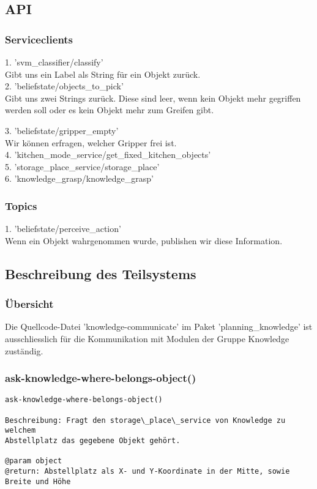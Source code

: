 \documentclass{suturo}
\begin{document}
\subsection{API}
\subsubsection{Serviceclients}
1. 'svm\_classifier/classify' \\
Gibt uns ein Label als String für ein Objekt zurück.\\

2. 'beliefstate/objects\_to\_pick'\\
Gibt uns zwei Strings zurück. Diese sind leer, wenn kein Objekt mehr gegriffen werden soll oder es kein Objekt mehr zum Greifen gibt.

3. 'beliefstate/gripper\_empty'\\
Wir können erfragen, welcher Gripper frei ist.\\

4. 'kitchen\_mode\_service/get\_fixed\_kitchen\_objects'\\

5. 'storage\_place\_service/storage\_place'\\

6. 'knowledge\_grasp/knowledge\_grasp'\\
\subsubsection{Topics}
1. 'beliefstate/perceive\_action'\\
Wenn ein Objekt wahrgenommen wurde, publishen wir diese Information.


\subsection{Beschreibung des Teilsystems}
\subsubsection{\"Ubersicht}
Die Quellcode-Datei 'knowledge-communicate' im Paket 'planning\_knowledge' ist ausschliesslich für die Kommunikation mit Modulen der Gruppe Knowledge zust\"andig.

\subsubsection{ask-knowledge-where-belongs-object()}
\begin{verbatim}
ask-knowledge-where-belongs-object()

Beschreibung: Fragt den storage\_place\_service von Knowledge zu welchem
Abstellplatz das gegebene Objekt gehört.

@param object
@return: Abstellplatz als X- und Y-Koordinate in der Mitte, sowie
Breite und Höhe
\end{verbatim}
\end{document}
